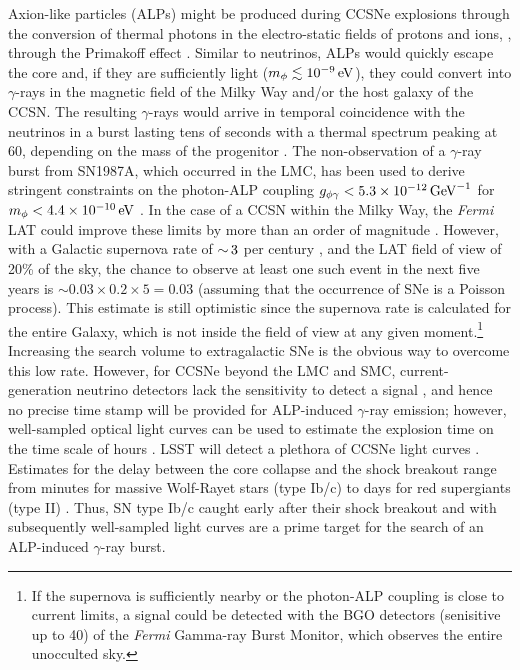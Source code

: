 Axion-like particles (ALPs) might be produced during CCSNe explosions through the conversion of thermal photons in the electro-static fields of protons and ions, \ie, through the Primakoff effect \citep{1996slfp.book.....R}.  
Similar to neutrinos, ALPs would quickly escape the core and, if they are sufficiently light ($m_\phi \lesssim 10^{-9} \mathrm{\,eV}$), they could convert into $\gamma$-rays in the magnetic field of the Milky Way and/or the host galaxy of the CCSN. 
The resulting $\gamma$-rays would arrive in temporal coincidence with the neutrinos in a burst lasting tens of seconds with a 
thermal spectrum peaking at 60\MeV, depending on the mass of the progenitor \citep{2015JCAP...02..006P}.
The non-observation of a $\gamma$-ray burst from SN1987A, which occurred in the LMC, has been used to derive stringent constraints on the photon-ALP coupling $g_{\phi\gamma}<5.3\times10^{-12}\mathrm{\,GeV}^{-1}$ for $m_\phi < 4.4\times10^{-10}\mathrm{\,eV}$ \citep{1996PhLB..383..439B, 1996PhRvL..77.2372G,2015JCAP...02..006P}.
In the case of a CCSN within the Milky Way, the \textit{Fermi} LAT could improve these limits by more than an order of magnitude \citep{2017PhRvL.118a1103M}. 
However, with a Galactic supernova rate of $ {\sim}\, 3$ per century \citep[\eg,][]{2013ApJ...778..164A}, and the LAT field of view of 20\% of the sky, the chance to observe at least one such event in the next five years is $\sim 0.03 \times 0.2 \times 5 = 0.03$ (assuming that the occurrence of SNe is a Poisson process). This estimate is still optimistic since the supernova rate is calculated for the entire Galaxy, which is not inside the field of view at any given moment.\footnote{If the supernova is sufficiently nearby or the photon-ALP coupling is close to current limits, a signal could be detected with the BGO detectors (senisitive up to 40\MeV) of the \emph{Fermi} Gamma-ray Burst Monitor, which observes the entire unocculted sky.}
Increasing the search volume to extragalactic SNe is the obvious way to overcome this low rate. 
However, for CCSNe beyond the LMC and SMC, current-generation neutrino detectors lack the sensitivity to detect a signal \citep[\eg,][]{2011PhRvD..83l3008K}, and hence no precise time stamp will be provided for ALP-induced $\gamma$-ray emission; however, well-sampled optical light curves can be used to estimate the explosion time on the time scale of hours \citep{2010APh....33...19C}. 
LSST will detect a plethora of CCSNe light curves \citep{Lien:2009}. 
Estimates for the delay between the core collapse and the shock breakout range from minutes for massive Wolf-Rayet stars (type Ib/c) to days for red supergiants (type II) \citep{2013ApJ...778...81K}. 
Thus, SN type Ib/c caught early after their shock breakout and with subsequently well-sampled light curves are a prime target for the search of an ALP-induced $\gamma$-ray burst. 

